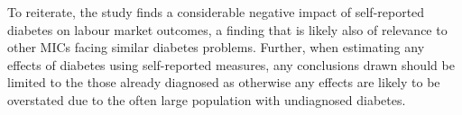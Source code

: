 \documentclass[12pt,english,british]{article}
\begin{document}
To reiterate, the study finds a considerable negative impact of self-reported diabetes on labour market outcomes, a finding that is likely also of relevance to other \ac{MICs} facing similar diabetes problems. Further, when estimating any effects of diabetes using self-reported measures, any conclusions drawn should be limited to the those already diagnosed as otherwise any effects are likely to be overstated due to the often large population with undiagnosed diabetes.


\noindent  




\end{document}
